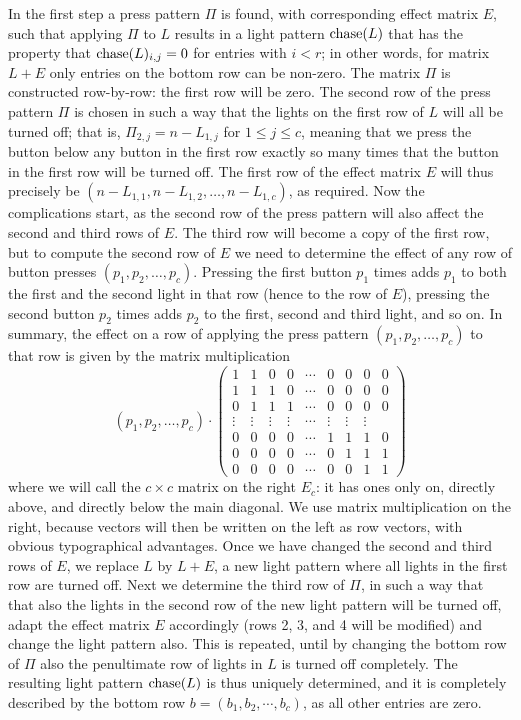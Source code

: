 In the first step a press pattern $\Pi$ is found,
with corresponding effect matrix $E$, such that applying
$\Pi$ to $L$ results in a light pattern $\operatorname{chase}(L)$ that has the property
that $\operatorname{chase}(L)_{i,j}=0$ for entries with $i<r$; in other words, 
for matrix $L+E$ only entries on the bottom row can be non-zero.
The matrix $\Pi$ is constructed 
row-by-row: the first row will be zero. The second row of the press pattern
$\Pi$ is chosen in such a way that the lights on the first row of $L$
will all be turned off; that is, $\Pi_{2,j}=n-L_{1,j}$ for $1\leq j\leq c$,
meaning that we press the button below any button in the first row exactly so many
times that the button in the first row will be turned off. The first row
of the effect matrix $E$ will thus precisely be $(n-L_{1,1}, n-L_{1,2},\ldots,
n-L_{1,c})$, as required. Now the complications start, as the second row
of the press pattern will also affect the second and third rows of $E$.
The third row will become a copy of the first row, but to compute the
second row of $E$ we need to determine the effect of any row of button presses
$(p_1, p_2, \ldots, p_c)$. Pressing the first button $p_1$ times adds $p_1$
to both the first and the second light in that row (hence to the row of $E$),
pressing the second button $p_2$ times adds $p_2$ to the first, second and third
light, and so on. In summary, the effect on a row of applying the press pattern
$(p_1, p_2, \ldots, p_c)$ to that row
is given by the matrix multiplication
$$(p_1, p_2, \ldots, p_c)\cdot
\begin{pmatrix}
1&1&0&0&\cdots&0&0&0&0\\
1&1&1&0&\cdots&0&0&0&0\\
0&1&1&1&\cdots&0&0&0&0\\
\vdots&\vdots&\vdots&\vdots&\cdots&\vdots&\vdots&\vdots\\
0&0&0&0&\cdots&1&1&1&0\\
0&0&0&0&\cdots&0&1&1&1\\
0&0&0&0&\cdots&0&0&1&1
\end{pmatrix}$$
where we will call the $c\times c$ matrix on the right $E_c$: it
has ones only on, directly above, and directly below the main diagonal.
We use matrix multiplication on the right, because vectors will then be
written on the left as row vectors, with obvious typographical advantages.
Once we have changed the second and third rows of $E$, we replace $L$
by $L+E$, a new light pattern where all lights in the first row are
turned off. Next we determine the third row of $\Pi$, in such a way that
that also the lights in the second row of the new light pattern will
be turned off, adapt the effect matrix $E$ accordingly (rows 2, 3, and 4
will be modified) and change the light pattern also. This is
repeated, until by changing the bottom row of $\Pi$ also the penultimate
row of lights in $L$ is turned off completely. The resulting
light pattern $\operatorname{chase}(L)$ is thus uniquely determined, and it is
completely described by the bottom row $b=(b_1, b_2, \cdots, b_c)$, as
all other entries are zero.


